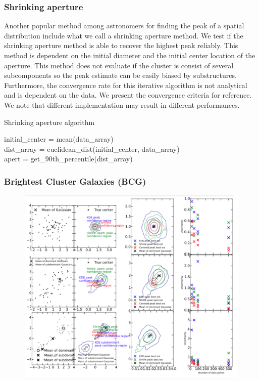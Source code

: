 \documentclass[usenatbib]{mn2e}
\begin{document}
\subsubsection{Shrinking aperture}
Another popular method among astronomers for finding the peak of a spatial
distribution include what we call a shrinking aperture method.
We test if the shrinking aperture method is able to recover the highest peak reliably.
This method is dependent on the initial diameter and the initial center location of the aperture.
This method does not evaluate if the cluster is consist of
several subcomponents so the peak estimate can be easily biased by
substructures. Furthermore, the convergence rate for this iterative algorithm is not
analytical and is dependent on the data. We present the
convergence criteria for reference. We note that different implementation may result in
different performances.
\begin{algorithm}
	\caption{Shrinking aperture algorithm}
	 \hrulefill

	initial_center = mean(data\_array)\\
 	dist\_array = euclidean_dist(initial_center, data_array)\\
 	apert = get\_90th\_percentile(dist\_array)\\ 
	   \hrulefill
 \end{algorithm}




\subsubsection{Brightest Cluster Galaxies (BCG)}

\begin{figure}
	\includegraphics[width=.95\linewidth]{figures/ph_fig_galaxycenter_mixtureTests.pdf}
	\caption{
		\label{fig:config}}
\end{figure}
\end{document}
